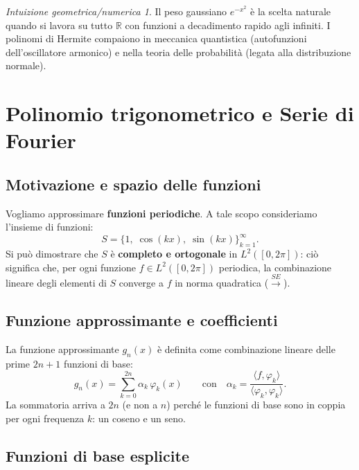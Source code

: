 \documentclass[a4paper,12pt]{article}
\theoremstyle{definition}
\theoremstyle{remark}
\newtheorem*{intuizione}{Intuizione geometrica/numerica}
\begin{document}
\begin{intuizione}
Il peso gaussiano $e^{-x^2}$ è la scelta naturale quando si lavora su tutto
$\mathbb{R}$ con funzioni a decadimento rapido agli infiniti. I polinomi di Hermite
compaiono in meccanica quantistica (autofunzioni dell'oscillatore armonico) e nella
teoria delle probabilità (legata alla distribuzione normale).
\end{intuizione}

\section{Polinomio trigonometrico e Serie di Fourier}

\subsection{Motivazione e spazio delle funzioni}

Vogliamo approssimare \textbf{funzioni periodiche}. A tale scopo consideriamo
l'insieme di funzioni:
\[
  S = \{1,\; \cos(kx),\; \sin(kx)\}_{k=1}^{\infty}.
\]
Si può dimostrare che $S$ è \textbf{completo e ortogonale} in $L^2([0, 2\pi])$:
ciò significa che, per ogni funzione $f \in L^2([0,2\pi])$ periodica, la combinazione
lineare degli elementi di $S$ converge a $f$ in norma quadratica
($\overset{SE}{\longrightarrow}$).

\subsection{Funzione approssimante e coefficienti}

La funzione approssimante $g_n(x)$ è definita come combinazione lineare delle prime
$2n+1$ funzioni di base:
\begin{equation}
  \boxed{
    g_n(x) = \sum_{k=0}^{2n} \alpha_k\,\varphi_k(x)
  }
  \qquad \text{con} \quad
  \alpha_k = \frac{\langle f, \varphi_k \rangle}{\langle \varphi_k, \varphi_k \rangle}.
\end{equation}
La sommatoria arriva a $2n$ (e non a $n$) perché le funzioni di base sono in coppia
per ogni frequenza $k$: un coseno e un seno.

\subsection{Funzioni di base esplicite}
\end{document}
